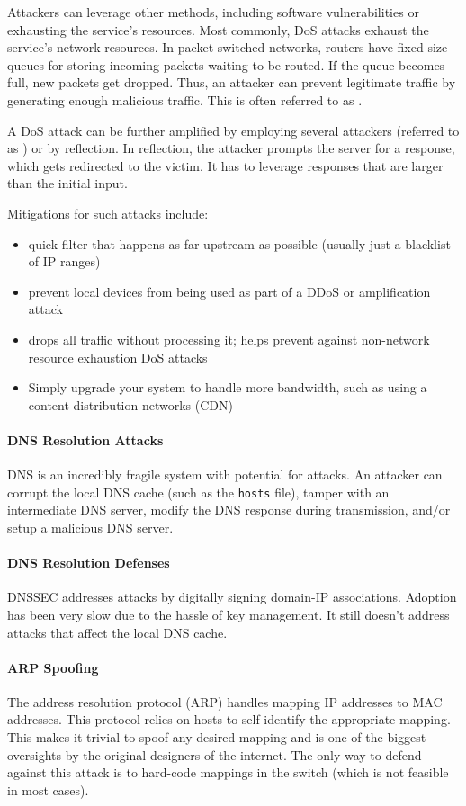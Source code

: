 Attackers can leverage other methods, including software vulnerabilities or exhausting the service's resources. Most commonly, DoS attacks exhaust the service's network resources. In packet-switched networks, routers have fixed-size queues for storing incoming packets waiting to be routed. If the queue becomes full, new packets get dropped. Thus, an attacker can prevent legitimate traffic by generating enough malicious traffic. This is often referred to as .

A DoS attack can be further amplified by employing several attackers (referred to as ) or by reflection. In reflection, the attacker prompts the server for a response, which gets redirected to the victim. It has to leverage responses that are larger than the initial input.

Mitigations for such attacks include:
\begin{itemize}
    \item {} quick filter that happens as far upstream as possible (usually just a blacklist of IP ranges)
    \item {} prevent local devices from being used as part of a DDoS or amplification attack
    \item {} drops all traffic without processing it; helps prevent against non-network resource exhaustion DoS attacks
    \item Simply upgrade your system to handle more bandwidth, such as using a content-distribution networks (CDN)
\end{itemize}

\paragraph*{DNS Resolution Attacks} DNS is an incredibly fragile system with potential for attacks. An attacker can corrupt the local DNS cache (such as the \texttt{hosts} file), tamper with an intermediate DNS server, modify the DNS response during transmission, and/or setup a malicious DNS server.

\paragraph*{DNS Resolution Defenses} DNSSEC addresses attacks by digitally signing domain-IP associations. Adoption has been very slow due to the hassle of key management. It still doesn't address attacks that affect the local DNS cache.

\paragraph*{ARP Spoofing} The address resolution protocol (ARP) handles mapping IP addresses to MAC addresses. This protocol relies on hosts to self-identify the appropriate mapping. This makes it trivial to spoof any desired mapping and is one of the biggest oversights by the original designers of the internet. The only way to defend against this attack is to hard-code mappings in the switch (which is not feasible in most cases).
